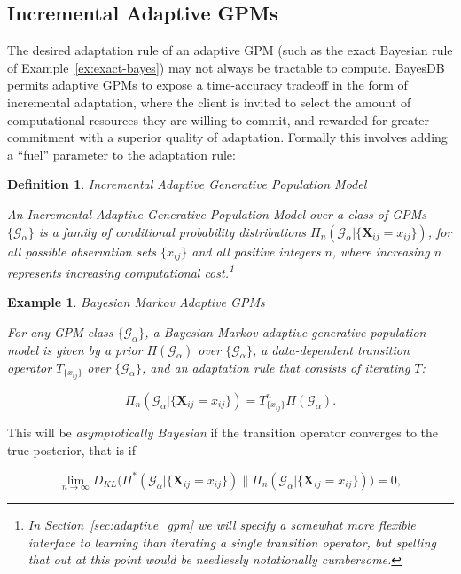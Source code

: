 \documentclass[10pt,letterpaper]{article}
\newtheorem{example}{Example}[section]
\newtheorem{definition}{Definition}[section]
\newcommand{\set}[1]{\{#1\}}
\newcommand{\G}{\mathcal{G}}
\newcommand{\T}{T}
\begin{document}
\subsection{Incremental Adaptive GPMs}
\label{sec:formalism-incremental-gpm}

The desired adaptation rule of an adaptive GPM (such as the exact
Bayesian rule of Example~\ref{ex:exact-bayes}) may not always be
tractable to compute.  BayesDB permits adaptive GPMs to expose a
time-accuracy tradeoff in the form of incremental adaptation, where
the client is invited to select the amount of computational resources
they are willing to commit, and rewarded for greater commitment with a
superior quality of adaptation.  Formally this involves adding a ``fuel''
parameter to the adaptation rule:

\begin{definition} Incremental Adaptive Generative Population Model
\label{def:incremental-adaptive}

An \emph{Incremental Adaptive Generative Population Model} over a
class of GPMs $\{\G_\alpha\}$ is a family of conditional probability
distributions $\Pi_n(\G_\alpha|\set{\mathbf{X}_{ij} = x_{ij}})$, for all
possible observation sets $\{x_{ij}\}$ and all positive integers $n$,
where increasing $n$ represents increasing computational
cost.\footnote{In Section~\ref{sec:adaptive_gpm} we will specify a
  somewhat more flexible interface to learning than iterating a single
  transition operator, but spelling that out at this point would be
  needlessly notationally cumbersome.}
\end{definition}

\begin{example} Bayesian Markov Adaptive GPMs

For any GPM class $\{\G_\alpha\}$, a \emph{Bayesian Markov adaptive
  generative population model} is given by a prior
$\Pi(\G_\alpha)$ over
$\{\G_\alpha\}$, a data-dependent transition operator
$\T_{\{x_{ij}\}}$ over $\{\G_\alpha\}$, and
an adaptation rule that consists of iterating $\T$:

\[ \Pi_n(\G_\alpha|\set{\mathbf{X}_{ij} = x_{ij}}) = \T_{\set{x_{ij}}}^n 
\Pi(\G_\alpha). \]
\label{ex:markov-bayes}
\end{example}

This will be \emph{asymptotically Bayesian} if the transition operator
converges to the true posterior, that is if

\[ \lim_{n\to\infty}D_{KL}\Big(\Pi^*(\G_\alpha|\set{\mathbf{X}_{ij} = x_{ij}}) \Big\| \Pi_n(\G_\alpha|\set{\mathbf{X}_{ij} = x_{ij}})\Big) = 0, \]
\end{document}
